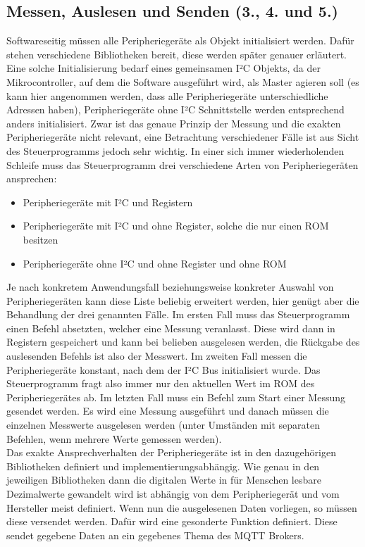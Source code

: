 \documentclass[a4paper, 12pt]{article}
\begin{document}
\subsection{Messen, Auslesen und Senden (3., 4. und 5.)}
Softwareseitig müssen alle Peripheriegeräte als Objekt initialisiert werden. Dafür stehen verschiedene Bibliotheken bereit, diese werden später genauer erläutert. Eine solche Initialisierung bedarf eines gemeinsamen I²C Objekts, da der Mikrocontroller, auf dem die Software ausgeführt wird, als Master agieren soll (es kann hier angenommen werden, dass alle Peripheriegeräte unterschiedliche Adressen haben), Peripheriegeräte ohne I²C Schnittstelle werden entsprechend anders initialisiert. Zwar ist das genaue Prinzip der Messung und die exakten Peripheriegeräte nicht relevant, eine Betrachtung verschiedener Fälle ist aus Sicht des Steuerprogramms jedoch sehr wichtig. In einer sich immer wiederholenden Schleife muss das Steuerprogramm drei verschiedene Arten von Peripheriegeräten ansprechen:
\begin{itemize}
\item Peripheriegeräte mit I²C und Registern
\item Peripheriegeräte mit I²C und ohne Register, solche die nur einen ROM besitzen
\item Peripheriegeräte ohne I²C und ohne Register und ohne ROM
\end{itemize}
Je nach konkretem Anwendungsfall beziehungsweise konkreter Auswahl von Peripheriegeräten kann diese Liste beliebig erweitert werden, hier genügt aber die Behandlung der drei genannten Fälle. Im ersten Fall muss das Steuerprogramm einen Befehl absetzten, welcher eine Messung veranlasst. Diese wird dann in Registern gespeichert und kann bei belieben ausgelesen werden, die Rückgabe des auslesenden Befehls ist also der Messwert. Im zweiten Fall messen die Peripheriegeräte konstant, nach dem der I²C Bus initialisiert wurde. Das Steuerprogramm fragt also immer nur den aktuellen Wert im ROM des Peripheriegerätes ab. Im letzten Fall muss ein Befehl zum Start einer Messung gesendet werden. Es wird eine Messung ausgeführt und danach müssen die einzelnen Messwerte ausgelesen werden (unter Umständen mit separaten Befehlen, wenn mehrere Werte gemessen werden).\\

Das exakte Ansprechverhalten der Peripheriegeräte ist in den dazugehörigen Bibliotheken definiert und implementierungsabhängig. Wie genau in den jeweiligen Bibliotheken dann die digitalen Werte in für Menschen lesbare Dezimalwerte gewandelt wird ist abhängig von dem Peripheriegerät und vom Hersteller meist definiert. Wenn nun die ausgelesenen Daten vorliegen, so müssen diese versendet werden. Dafür wird eine gesonderte Funktion definiert. Diese sendet gegebene Daten an ein gegebenes Thema des MQTT Brokers.
\end{document}
